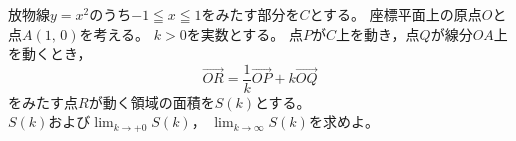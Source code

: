 \documentclass[../../main.tex]{subfiles}
\begin{document}
放物線$y=x^2$のうち$-1 \leqq x \leqq 1$をみたす部分を$C$とする。
座標平面上の原点$O$と点$A(1, \, 0)$を考える。
$k>0$を実数とする。
点$P$が$C$上を動き，点$Q$が線分$OA$上を動くとき，
\[ \overrightarrow{OR}=
\displaystyle\frac{1}{k}\overrightarrow{OP}+k\overrightarrow{OQ} \]
をみたす点$R$が動く領域の面積を$S(k)$とする。\\
$S(k)$および$\displaystyle\lim_{k\to+0}S(k)$，
$\displaystyle\lim_{k\to\infty}S(k)$を求めよ。
\end{document}
